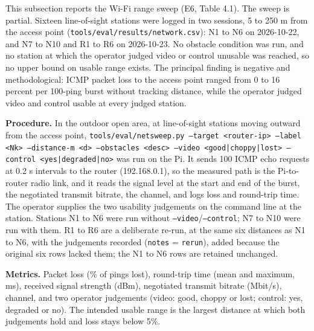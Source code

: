 This subsection reports the Wi-Fi range sweep (E6, Table 4.1). The sweep is partial. Sixteen line-of-sight stations were logged in two sessions, 5 to 250 m from the access point (\texttt{tools/eval/results/network.csv}): N1 to N6 on 2026-10-22, and N7 to N10 and R1 to R6 on 2026-10-23. No obstacle condition was run, and no station at which the operator judged video or control unusable was reached, so no upper bound on usable range exists. The principal finding is negative and methodological: ICMP packet loss to the access point ranged from 0 to 16 percent per 100-ping burst without tracking distance, while the operator judged video and control usable at every judged station.

\textbf{Procedure.} In the outdoor open area, at line-of-sight stations moving outward from the access point, \texttt{tools/eval/netsweep.py --target <router-ip> --label <Nk> --distance-m <d> --obstacles <desc> --video <good|choppy|lost> --control <yes|degraded|no>} was run on the Pi. It sends 100 ICMP echo requests at 0.2 s intervals to the router (192.168.0.1), so the measured path is the Pi-to-router radio link, and it reads the signal level at the start and end of the burst, the negotiated transmit bitrate, the channel, and logs loss and round-trip time. The operator supplies the two usability judgements on the command line at the station. Stations N1 to N6 were run without \texttt{--video}/\texttt{--control}; N7 to N10 were run with them. R1 to R6 are a deliberate re-run, at the same six distances as N1 to N6, with the judgements recorded (\texttt{notes} = \texttt{rerun}), added because the original six rows lacked them; the N1 to N6 rows are retained unchanged.

\textbf{Metrics.} Packet loss (\% of pings lost), round-trip time (mean and maximum, ms), received signal strength (dBm), negotiated transmit bitrate (Mbit/s), channel, and two operator judgements (video: good, choppy or lost; control: yes, degraded or no). The intended usable range is the largest distance at which both judgements hold and loss stays below 5\%.


